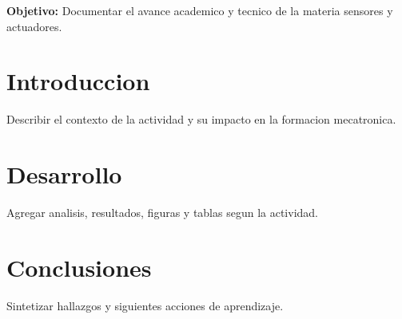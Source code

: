 \documentclass[spanish,letterpaper,oneside]{article}
\begin{document}
\templatePortrait
\templatePagecfg
\onehalfspacing

\begin{abstractd}
\textbf{Objetivo:} Documentar el avance academico y tecnico de la materia sensores y actuadores.
\end{abstractd}

\templateIndex
\templateFinalcfg

\section{Introduccion}
Describir el contexto de la actividad y su impacto en la formacion mecatronica.

\section{Desarrollo}
Agregar analisis, resultados, figuras y tablas segun la actividad.

\section{Conclusiones}
Sintetizar hallazgos y siguientes acciones de aprendizaje.



\end{document}
